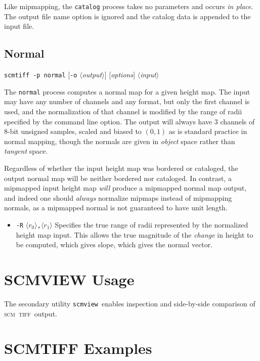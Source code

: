 \documentclass[oneside,11pt]{memoir}
\newcommand{\scm}     {\textsc{scm}}
\newcommand{\tiff}    {\textsc{tiff}}
\newcommand{\scmtiff} {\texttt{scmtiff}}
\newcommand{\scmview} {\texttt{scmview}}
\newcommand{\inangles}[1]{$\langle$#1$\rangle$}
\newenvironment{optionlist}
  {\setlength{\leftmargini}{1in}\begin{itemize}}{\end{itemize}}
\begin{document}
\begin{Spacing}{1.1}
Like mipmapping, the \texttt{catalog} process takes no parameters and occurs \emph{in place}. The output file name option is ignored and the catalog data is appended to the input file.

\subsection{Normal}

\noindent\scmtiff\ \texttt{-p normal} [\texttt{-o} \inangles{\textit{output}}] [\textit{options}] \inangles{\textit{input}}

\bigskip The \texttt{normal} process computes a normal map for a given height map. The input may have any number of channels and any format, but only the first channel is used, and the normalization of that channel is modified by the range of radii specified by the command line option. The output will always have 3 channels of 8-bit unsigned samples, scaled and biased to $(0,1)$ as is standard practice in normal mapping, though the normals are given in \emph{object} space rather than \emph{tangent} space.

Regardless of whether the input height map was bordered or cataloged, the output normal map will be neither bordered nor cataloged. In contrast, a mipmapped input height map \emph{will} produce a mipmapped normal map output, and indeed one should \emph{always} normalize mipmaps instead of mipmapping normals, as a mipmapped normal is not guaranteed to have unit length.

\begin{optionlist}
\item[\texttt{-R} \inangles{$r_0$}\texttt{,}\inangles{$r_1$}] Specifies the true range of radii represented by the normalized height map input. This allows the true magnitude of the \emph{change} in height to be computed, which gives slope, which gives the normal vector.
\end{optionlist}

\section{SCMVIEW Usage}

The secondary utility \scmview\ enables inspection and side-by-side comparison of \scm\ \tiff\ output.

\section{SCMTIFF Examples}


\end{Spacing}
\end{document}
